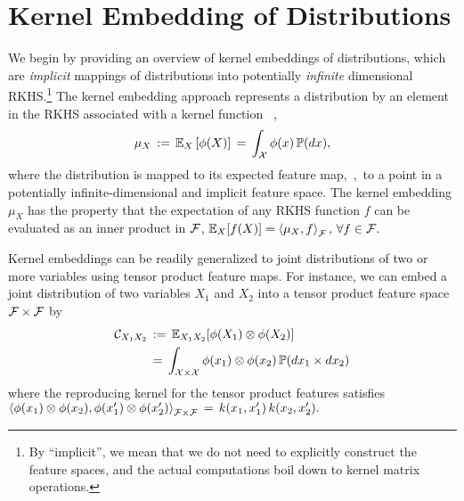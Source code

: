 \documentclass{article}
\begin{document}
%



\section{Kernel Embedding of Distributions}
\label{sec:embedding}

We begin by providing an overview of kernel embeddings of distributions, which are \emph{implicit} mappings of distributions into potentially \emph{infinite} dimensional RKHS.\footnote{By ``implicit'', we mean that we do not need to explicitly construct the feature spaces, and the actual computations boil down to kernel matrix operations.} The kernel embedding approach represents a distribution by an element in the RKHS associated with a kernel function \, \cite{SmoGreSonSch07,SriGreFukLanetal08},
\begin{align}
  \mu_{X} \, := \, \mathbb{E}_{X} \left[\phi(X)\right] \, = \, \int_{\mathcal{X}} \phi(x) \, \mathbb{P}(dx),  \label{eq:embedding}
\end{align}
where the distribution is mapped to its expected feature map,~\ie,~to a point in a potentially infinite-dimensional and implicit feature space.
 The kernel embedding $\mu_{X}$ has the property that the expectation of any RKHS function $f$ can be evaluated as an inner product in $\mathcal{F}$,
$
  \mathbb{E}_{X} [f(X)] = \left\langle \mu_{X},f \right\rangle_{\mathcal{F}}, \, \forall f\in\mathcal{F}.
$

Kernel embeddings can be readily generalized to joint distributions of two or more variables using tensor product feature maps. For instance, we can embed a joint distribution of two variables $X_1$ and $X_2$ into a tensor product feature space $\mathcal{F}\times \mathcal{F}$ by
\begin{align}
    \mathcal{C}_{X_1X_2} \, &:= \, \mathbb{E}_{X_1X_2}[\phi(X_1)\otimes \phi(X_2)] \\
    \, &= \, \int_{\mathcal{X} \times \mathcal{X}} \phi(x_1) \otimes \phi(x_2) \, \mathbb{P}(dx_1 \times dx_2)
\end{align}
where the reproducing kernel for the tensor product features satisfies
$
	\left\langle \phi(x_1)\otimes \phi(x_2) ,\phi(x_1')\otimes \phi(x_2')  \right\rangle_{\mathcal{F}\times \mathcal{F}} \, = \,  k(x_1,x_1')\,k(x_2,x_2').
$
\end{document}
